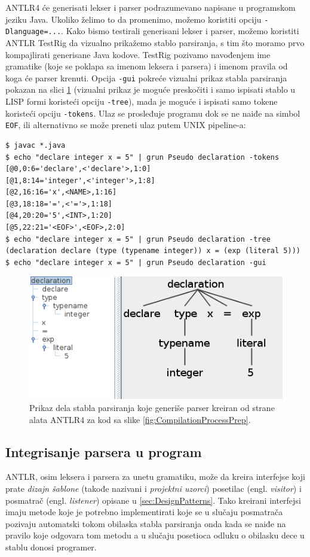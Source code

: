 ANTLR4 će generisati lekser i parser podrazumevano napisane u programskom jeziku Java. Ukoliko želimo to da promenimo, možemo koristiti opciju \texttt{-Dlanguage=...}. Kako bismo testirali generisani lekser i parser, možemo koristiti ANTLR TestRig da vizualno prikažemo stablo parsiranja, s tim što moramo prvo kompajlirati generisane Java kodove. TestRig pozivamo navođenjem ime gramatike (koje se poklapa sa imenom leksera i parsera) i imenom pravila od koga će parser krenuti. Opcija \texttt{-gui} pokreće vizualni prikaz stabla parsiranja pokazan na slici \ref{fig:PseudoTreeGui} (vizualni prikaz je moguće preskočiti i samo ispisati stablo u LISP formi koristeći opciju \texttt{-tree}), mada je moguće i ispisati samo tokene koristeći opciju \texttt{-tokens}. Ulaz se prosleđuje programu dok se ne naiđe na simbol \texttt{EOF}, ili alternativno se može preneti ulaz putem UNIX pipeline-a:
\begin{lstlisting}[language={}]
$ javac *.java
$ echo "declare integer x = 5" | grun Pseudo declaration -tokens
[@0,0:6='declare',<'declare'>,1:0]
[@1,8:14='integer',<'integer'>,1:8]
[@2,16:16='x',<NAME>,1:16]
[@3,18:18='=',<'='>,1:18]
[@4,20:20='5',<INT>,1:20]
[@5,22:21='<EOF>',<EOF>,2:0]
$ echo "declare integer x = 5" | grun Pseudo declaration -tree
(declaration declare (type (typename integer)) x = (exp (literal 5)))
$ echo "declare integer x = 5" | grun Pseudo declaration -gui
\end{lstlisting}    

\begin{figure}[h!]
    \centering
        \includegraphics[scale=0.8]{images/pseudo_parse_tree.png}
    \caption{Prikaz dela stabla parsiranja koje generiše parser kreiran od strane alata ANTLR4 za kod sa slike \ref{fig:CompilationProcessPrep}.}
    \label{fig:PseudoTreeGui}
\end{figure}


\subsection{Integrisanje parsera u program}
\label{subsec:ANTLRParserIntegration}

ANTLR, osim leksera i parsera za unetu gramatiku, može da kreira interfejse koji prate \emph{dizajn šablone} (takođe nazivani i \emph{projektni uzorci}) posetilac (engl. \emph{visitor}) i posmatrač (engl. \emph{listener}) opisane u \ref{sec:DesignPatterns}. Tako kreirani interfejsi imaju metode koje je potrebno implementirati koje se u slučaju posmatrača pozivaju automatski tokom obilaska stabla parsiranja onda kada se naiđe na pravilo koje odgovara tom metodu a u slučaju posetioca odluku o obilasku dece u stablu donosi programer.

